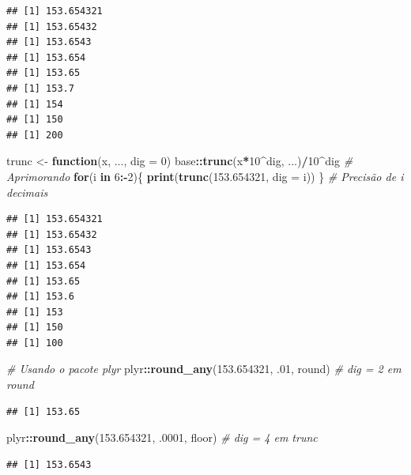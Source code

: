 \documentclass[
]{book}
\newenvironment{Shaded}{\begin{snugshade}}{\end{snugshade}}
\newcommand{\CommentTok}[1]{\textcolor[rgb]{0.56,0.35,0.01}{\textit{#1}}}
\newcommand{\ControlFlowTok}[1]{\textcolor[rgb]{0.13,0.29,0.53}{\textbf{#1}}}
\newcommand{\DataTypeTok}[1]{\textcolor[rgb]{0.13,0.29,0.53}{#1}}
\newcommand{\DecValTok}[1]{\textcolor[rgb]{0.00,0.00,0.81}{#1}}
\newcommand{\FloatTok}[1]{\textcolor[rgb]{0.00,0.00,0.81}{#1}}
\newcommand{\KeywordTok}[1]{\textcolor[rgb]{0.13,0.29,0.53}{\textbf{#1}}}
\newcommand{\NormalTok}[1]{#1}
\newcommand{\OperatorTok}[1]{\textcolor[rgb]{0.81,0.36,0.00}{\textbf{#1}}}
\newcommand{\StringTok}[1]{\textcolor[rgb]{0.31,0.60,0.02}{#1}}
\theoremstyle{definition}
\theoremstyle{definition}
\theoremstyle{definition}
\theoremstyle{remark}
\begin{document}
\begin{verbatim}
## [1] 153.654321
## [1] 153.65432
## [1] 153.6543
## [1] 153.654
## [1] 153.65
## [1] 153.7
## [1] 154
## [1] 150
## [1] 200
\end{verbatim}

\begin{Shaded}
\begin{Highlighting}[]
\NormalTok{trunc \textless{}{-}}\StringTok{ }\ControlFlowTok{function}\NormalTok{(x, ..., }\DataTypeTok{dig =} \DecValTok{0}\NormalTok{) base}\OperatorTok{::}\KeywordTok{trunc}\NormalTok{(x}\OperatorTok{*}\DecValTok{10}\OperatorTok{\^{}}\NormalTok{dig, ...)}\OperatorTok{/}\DecValTok{10}\OperatorTok{\^{}}\NormalTok{dig   }\CommentTok{\# Aprimorando}
\ControlFlowTok{for}\NormalTok{(i }\ControlFlowTok{in} \DecValTok{6}\OperatorTok{:{-}}\DecValTok{2}\NormalTok{)\{ }\KeywordTok{print}\NormalTok{(}\KeywordTok{trunc}\NormalTok{(}\FloatTok{153.654321}\NormalTok{, }\DataTypeTok{dig =}\NormalTok{ i)) \}        }\CommentTok{\# Precisão de i decimais}
\end{Highlighting}
\end{Shaded}

\begin{verbatim}
## [1] 153.654321
## [1] 153.65432
## [1] 153.6543
## [1] 153.654
## [1] 153.65
## [1] 153.6
## [1] 153
## [1] 150
## [1] 100
\end{verbatim}

\begin{Shaded}
\begin{Highlighting}[]
\CommentTok{\# Usando o pacote plyr}
\NormalTok{plyr}\OperatorTok{::}\KeywordTok{round\_any}\NormalTok{(}\FloatTok{153.654321}\NormalTok{, }\FloatTok{.01}\NormalTok{, round)           }\CommentTok{\# dig = 2 em round}
\end{Highlighting}
\end{Shaded}

\begin{verbatim}
## [1] 153.65
\end{verbatim}

\begin{Shaded}
\begin{Highlighting}[]
\NormalTok{plyr}\OperatorTok{::}\KeywordTok{round\_any}\NormalTok{(}\FloatTok{153.654321}\NormalTok{, }\FloatTok{.0001}\NormalTok{, floor)         }\CommentTok{\# dig = 4 em trunc}
\end{Highlighting}
\end{Shaded}

\begin{verbatim}
## [1] 153.6543
\end{verbatim}
\end{document}
